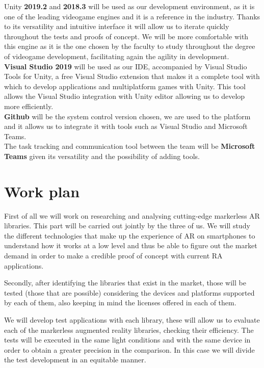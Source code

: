 Unity \textbf{2019.2} and \textbf{2018.3} will be used as our development environment, as it is one of the leading videogame engines and it is a reference in the industry. Thanks to its versatility and intuitive interface it will allow us to iterate quickly throughout the tests and proofs of concept. We will be more comfortable with this engine as it is the one chosen by the faculty to study throughout the degree of videogame development, facilitating again the agility in development.\\

\textbf{Visual Studio 2019} will be used as our IDE, accompanied by Visual Studio Tools for Unity, a free Visual Studio extension that makes it a complete tool with which to develop applications and multiplatform games with Unity. This tool allows the Visual Studio integration with Unity editor allowing us to develop more efficiently.\\

\textbf{Github} will be the system control version chosen, we are used to the platform and it allows us to integrate it with tools such as Visual Studio and Microsoft Teams.\\

The task tracking and communication tool between the team will be \textbf{Microsoft Teams} given its versatility and the possibility of adding tools.



\section{Work plan}
First of all we will work on researching and analysing cutting-edge markerless AR libraries. This part will be carried out jointly by the three of us. We will study the different technologies that make up the experience of AR on smartphones to understand how it works at a low level and thus be able to figure out the market demand in order to make a credible proof of concept with current RA applications.\vspace{\baselineskip}

Secondly, after identifying the libraries that exist in the market, those will be tested (those that are possible) considering the devices and platforms supported by each of them, also keeping in mind the licenses offered in each of them.

We will develop test applications with each library, these will allow us to evaluate each of the markerless augmented reality libraries, checking their efficiency. The tests will be executed in the same light conditions and with the same device in order to obtain a greater precision in the comparison. In this case we will divide the test development in an equitable manner.\vspace{\baselineskip}


